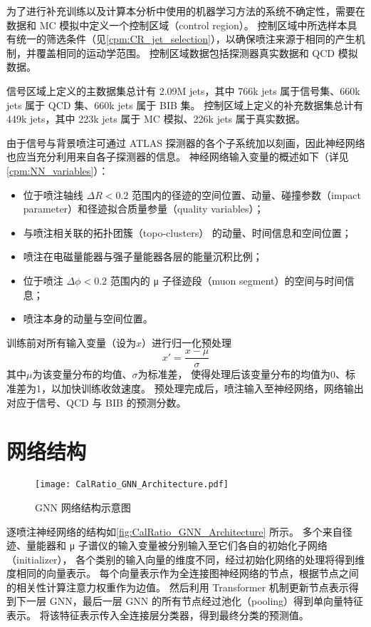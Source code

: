 为了进行补充训练以及计算本分析中使用的机器学习方法的系统不确定性，需要在数据和 MC 模拟中定义一个控制区域（control region）。
控制区域中所选样本具有统一的筛选条件（见\autoref{cpm:CR_jet_selection}），以确保喷注来源于相同的产生机制，并覆盖相同的运动学范围。
控制区域数据包括探测器真实数据和 QCD 模拟数据。

信号区域上定义的主数据集总计有 2.09M jets，其中 766k jets 属于信号集、660k jets 属于 QCD 集、660k jets 属于 BIB 集。
控制区域上定义的补充数据集总计有 449k jets，其中 223k jets 属于 MC 模拟、226k jets 属于真实数据。

由于信号与背景喷注可通过 ATLAS 探测器的各个子系统加以刻画，因此神经网络也应当充分利用来自各子探测器的信息。
神经网络输入变量的概述如下（详见\autoref{cpm:NN_variables}）：
\begin{itemize}
    \item 位于喷注轴线 $\Delta R < 0.2$ 范围内的径迹的空间位置、动量、碰撞参数（impact parameter）和径迹拟合质量参量（quality variables）；
    \item 与喷注相关联的拓扑团簇（topo-clusters） 的动量、时间信息和空间位置；
    \item 喷注在电磁量能器与强子量能器各层的能量沉积比例；
    \item 位于喷注 $\Delta \phi < 0.2$ 范围内的 μ 子径迹段（muon segment）的空间与时间信息；
    \item 喷注本身的动量与空间位置。
\end{itemize}

训练前对所有输入变量（设为$x$）进行归一化预处理
\begin{equation}
    x' = \frac{x-\mu}{\sigma}
\end{equation}
其中$\mu$为该变量分布的均值、$\sigma$为标准差，
使得处理后该变量分布的均值为0、标准差为1，以加快训练收敛速度。
预处理完成后，喷注输入至神经网络，网络输出对应于信号、QCD 与 BIB 的预测分数。


\section{网络结构}
\begin{figure}[ht]
    \centering
    \texttt{[image: CalRatio\_GNN\_Architecture.pdf]}
    \caption{GNN 网络结构示意图}
    \label{fig:CalRatio_GNN_Architecture}
\end{figure}

逐喷注神经网络的结构如\autoref{fig:CalRatio_GNN_Architecture} 所示。
多个来自径迹、量能器和 μ 子谱仪的输入变量被分别输入至它们各自的初始化子网络（initializer），
各个类别的输入向量的维度不同，经过初始化网络的处理将得到维度相同的向量表示。
每个向量表示作为全连接图神经网络的节点，根据节点之间的相关性计算注意力权重作为边值。
然后利用 Transformer 机制更新节点表示得到下一层 GNN，最后一层 GNN 的所有节点经过池化（pooling）得到单向量特征表示。
将该特征表示传入全连接层分类器，得到最终分类的预测值。

